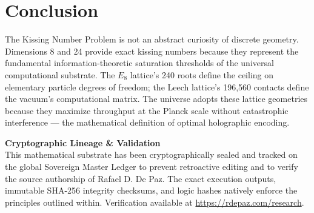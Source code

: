 \documentclass[12pt, a4paper]{article}
\theoremstyle{plain}
\theoremstyle{definition}
\begin{document}
\section{Conclusion}

The Kissing Number Problem is not an abstract curiosity of discrete geometry. Dimensions 8 and 24 provide exact kissing numbers because they represent the fundamental information-theoretic saturation thresholds of the universal computational substrate. The $E_8$ lattice's 240 roots define the ceiling on elementary particle degrees of freedom; the Leech lattice's 196,560 contacts define the vacuum's computational matrix. The universe adopts these lattice geometries because they maximize throughput at the Planck scale without catastrophic interference --- the mathematical definition of optimal holographic encoding.

\vspace{2em}
\noindent\hrulefill
\vspace{1em}







\vspace{3em}
\noindent\hrulefill
\vspace{1em}

\noindent\textbf{Cryptographic Lineage \& Validation}\\
This mathematical substrate has been cryptographically sealed and tracked on the global Sovereign Master Ledger to prevent retroactive editing and to verify the source authorship of Rafael D. De Paz. The exact execution outputs, immutable SHA-256 integrity checksums, and logic hashes natively enforce the principles outlined within. Verification available at \url{https://rdepaz.com/research}.
\end{document}
